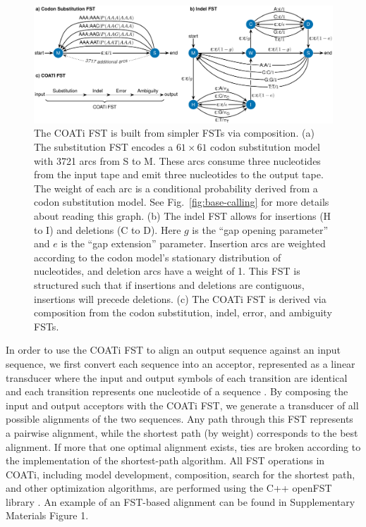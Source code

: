 \documentclass[12pt,letterpaper]{article}
\begin{document}
\begin{figure}[h!]
\includegraphics[width=\textwidth]{figures/fig-fst-coati.pdf}
\caption{The COATi FST is built from simpler FSTs via composition.
(a) The substitution FST encodes a $61 \times 61 $ codon substitution model with 3721 arcs from S to M. These arcs consume three nucleotides from the input tape and emit three nucleotides to the output tape. The weight of each arc is a conditional probability derived from a codon substitution model. See Fig.~\ref{fig:base-calling} for more details about reading this graph.
%
(b) The indel FST allows for insertions (H to I) and deletions (C to D). Here $g$ is the ``gap opening parameter'' and $e$ is the ``gap extension'' parameter.
Insertion arcs are weighted according to the codon model's stationary distribution of nucleotides, and deletion arcs have a weight of 1. This FST is structured such that if insertions and deletions are contiguous, insertions will precede deletions.
%
(c) The COATi FST is derived via composition from the codon substitution, indel, error, and ambiguity FSTs.
}
\label{fig:coati-fst}
\end{figure}

In order to use the COATi FST to align an output sequence against an input sequence, we first convert each sequence into an acceptor, represented as a linear transducer where the input and output symbols of each transition are identical and each transition represents one nucleotide of a sequence \citep{allauzen2007openfst}. By composing the input and output acceptors with the COATi FST, we generate a transducer of all possible alignments of the two sequences. Any path through this FST represents a pairwise alignment, while the shortest path (by weight) corresponds to the best alignment. If more that one optimal alignment exists, ties are broken according to the implementation of the shortest-path algorithm. All FST operations in COATi, including model development, composition, search for the shortest path, and other optimization algorithms, are performed using the C++ openFST library \citep{allauzen2007openfst}. An example of an FST-based alignment can be found in Supplementary Materials Figure 1.
\end{document}
